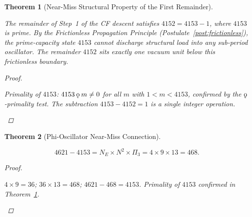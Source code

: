 \documentclass[11pt, letterpaper]{article}
\newcommand{\koppa}{\mathbin{\text{\rm\k{o}}}}
\newcommand{\Pithree}{\Pi_3}
\theoremstyle{definition}
\theoremstyle{plain}
\newtheorem{theorem}{Theorem}[section]
\begin{document}
\begin{theorem}[Near-Miss Structural Property of the First Remainder]
\label{thm:nearmiss}
\begin{rsbox}
The remainder of Step~1 of the CF descent satisfies $4152=4153-1$, where
$4153$ is prime.  By the Frictionless Propagation Principle
(Postulate~\ref{post:frictionless}), the prime-capacity state $4153$ cannot
discharge structural load into any sub-period oscillator.  The remainder
$4152$ sits exactly one vacuum unit below this frictionless boundary.
\end{rsbox}
\begin{proof}
\begin{rsbox}
Primality of $4153$: $4153\koppa m\neq 0$ for all $m$ with $1<m<4153$,
confirmed by the $\koppa$-primality test.
The subtraction $4153-4152=1$ is a single integer operation.
\end{rsbox}
\end{proof}
\end{theorem}

\begin{theorem}[Phi-Oscillator Near-Miss Connection]
\label{thm:phiosc-nearmiss}
\begin{rsbox}
\[
4621 - 4153 = N_E\times N^2\times\Pithree = 4\times9\times13 = 468.
\]
\end{rsbox}
\begin{proof}
\begin{rsbox}
$4\times9=36$; $36\times13=468$; $4621-468=4153$.
Primality of $4153$ confirmed in Theorem~\ref{thm:nearmiss}.
\end{rsbox}
\end{proof}
\end{theorem}
\end{document}
